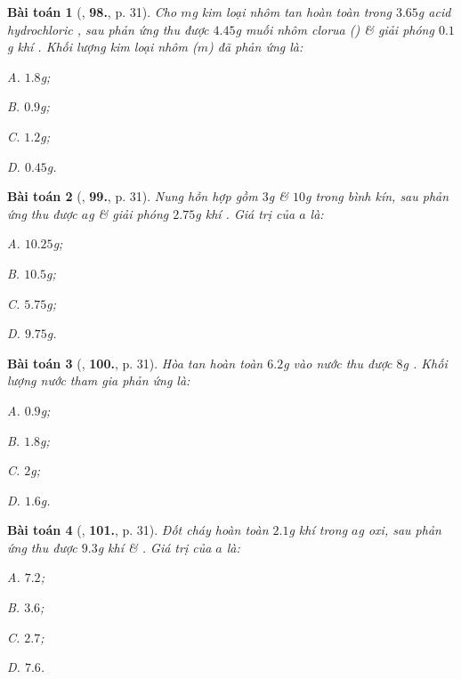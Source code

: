 \documentclass{article}
\numberwithin{equation}{section}
\newtheorem{baitoan}{Bài toán}
\begin{document}
\begin{baitoan}[\cite{An2011}, \textbf{98.}, p. 31]
	Cho $m$g kim loại nhôm tan hoàn toàn trong $3.65$g acid hydrochloric , sau phản ứng thu được $4.45$g muối nhôm clorua () \& giải phóng $0.1$g khí . Khối lượng kim loại nhôm ($m$) đã phản ứng là:
	\begin{enumerate*}
		\item[{\rm\sf A.}] $1.8$g;
		\item[{\rm\sf B.}] $0.9$g;
		\item[{\rm\sf C.}] $1.2$g;
		\item[{\rm\sf D.}] $0.45$g.
	\end{enumerate*}
\end{baitoan}

\begin{baitoan}[\cite{An2011}, \textbf{99.}, p. 31]
	Nung hỗn hợp gồm $3$g  \& $10$g  trong bình kín, sau phản ứng thu được $a$g  \& giải phóng $2.75$g khí . Giá trị của $a$ là:
	\begin{enumerate*}
		\item[{\rm\sf A.}] $10.25$g;
		\item[{\rm\sf B.}] $10.5$g;
		\item[{\rm\sf C.}] $5.75$g;
		\item[{\rm\sf D.}] $9.75$g.
	\end{enumerate*}
\end{baitoan}

\begin{baitoan}[\cite{An2011}, \textbf{100.}, p. 31]
	Hòa tan hoàn toàn $6.2$g  vào nước thu được $8$g . Khối lượng nước tham gia phản ứng là:
	\begin{enumerate*}
		\item[{\rm\sf A.}] $0.9$g;
		\item[{\rm\sf B.}] $1.8$g;
		\item[{\rm\sf C.}] $2$g;
		\item[{\rm\sf D.}] $1.6$g.
	\end{enumerate*}
\end{baitoan}

\begin{baitoan}[\cite{An2011}, \textbf{101.}, p. 31]
	Đốt cháy hoàn toàn $2.1$g khí  trong $a$g oxi, sau phản ứng thu được $9.3$g khí  \& . Giá trị của $a$ là:
	\begin{enumerate*}
		\item[{\rm\sf A.}] $7.2$;
		\item[{\rm\sf B.}] $3.6$;
		\item[{\rm\sf C.}] $2.7$;
		\item[{\rm\sf D.}] $7.6$.
	\end{enumerate*}
\end{baitoan}
\end{document}
